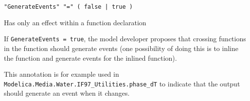 \begin{annotationdefinition}[GenerateEvents]
\begin{synopsis}[grammar]\begin{lstlisting}
"GenerateEvents" "=" ( false | true )
\end{lstlisting}\end{synopsis}
\begin{semantics}
Has only an effect within a function declaration

If \lstinline!GenerateEvents = true!, the model developer proposes that crossing functions in the function should generate events (one possibility of doing this is to inline the function and generate events for the inlined function).

\begin{nonnormative}
This annotation is for example used in \lstinline!Modelica.Media.Water.IF97_Utilities.phase_dT! to indicate that the output should generate an event when it changes.
\end{nonnormative}
\end{semantics}
\end{annotationdefinition}

